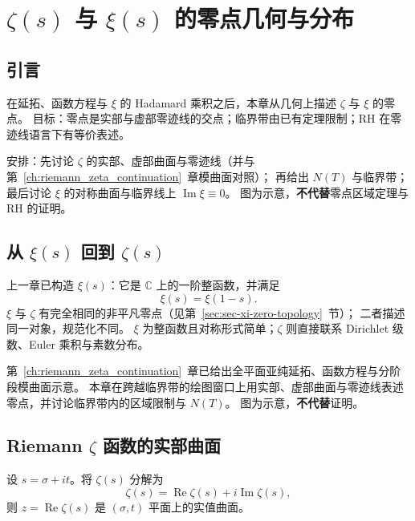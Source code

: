 
\chapter{\texorpdfstring{$\zeta(s)$}{Zeta(s)} 与 \texorpdfstring{$\xi(s)$}{xi(s)} 的零点几何与分布}\label{ch:zero_distribution}

\section*{引言}\label{sec:intro_zero_distribution}

在延拓、函数方程与 $\xi$ 的 Hadamard 乘积之后，本章从几何上描述 $\zeta$ 与 $\xi$ 的零点。
目标：零点是实部与虚部零迹线的交点；临界带由已有定理限制；RH 在零迹线语言下有等价表述。

安排：先讨论 $\zeta$ 的实部、虚部曲面与零迹线（并与第~\ref{ch:riemann_zeta_continuation}~章模曲面对照）；
再给出 $N(T)$ 与临界带；最后讨论 $\xi$ 的对称曲面与临界线上 $\operatorname{Im}\xi\equiv0$。
图为示意，\textbf{不代替}零点区域定理与 RH 的证明。

\section{从 \texorpdfstring{$\xi(s)$}{xi(s)} 回到 \texorpdfstring{$\zeta(s)$}{Zeta(s)}}

上一章已构造 $\xi(s)$：它是 $\mathbb{C}$ 上的一阶整函数，并满足
\[
\xi(s)=\xi(1-s).
\]
$\xi$ 与 $\zeta$ 有完全相同的非平凡零点（见第~\ref{sec:sec-xi-zero-topology}~节）；
二者描述同一对象，规范化不同。
$\xi$ 为整函数且对称形式简单；$\zeta$ 则直接联系 Dirichlet 级数、Euler 乘积与素数分布。

第~\ref{ch:riemann_zeta_continuation}~章已给出全平面亚纯延拓、函数方程与分阶段模曲面示意。
本章在跨越临界带的绘图窗口上用实部、虚部曲面与零迹线表述零点，并讨论临界带内的区域限制与 $N(T)$。
图为示意，\textbf{不代替}证明。

\section{ Riemann \texorpdfstring{$\zeta$}{Zeta} 函数的实部曲面}
\label{sec:zeta_real_surface}

设 $s=\sigma+it$。将 $\zeta(s)$ 分解为
\[
\zeta(s)=\operatorname{Re}\zeta(s)+i\operatorname{Im}\zeta(s),
\]
则 $z=\operatorname{Re}\zeta(s)$ 是 $(\sigma,t)$ 平面上的实值曲面。

